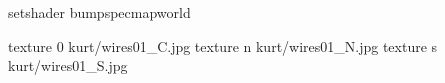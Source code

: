 setshader bumpspecmapworld

texture 0 kurt/wires01_C.jpg
texture n kurt/wires01_N.jpg
texture s kurt/wires01_S.jpg

